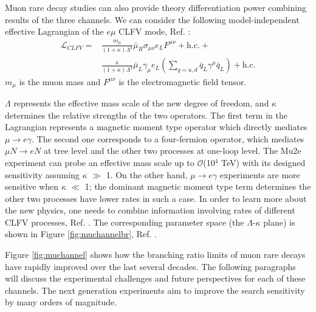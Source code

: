 Muon rare decay studies can also provide theory differentiation power 
combining results of the three channels. We can consider the following model-independent 
effective Lagrangian of the $e \mu$ CLFV mode, Ref. \cite{doi:10.1146/annurev-nucl-100809-131949}:
\begin{equation}\label{LCF}
\begin{aligned}
\mathscr{L}_{C L F V}= & \frac{m_\mu}{(1+\kappa) \Lambda^2} \bar{\mu}_R \sigma_{\mu \nu} e_L F^{\mu \nu}+\text{h.c.}+ \\
&\frac{\kappa}{(1+\kappa) \Lambda^2} \bar{\mu}_L \gamma_\mu e_L\left(\sum_{q=u, d} \bar{q}_L \gamma^\mu \bar{q}_L\right)+\text{h.c.}
\end{aligned}
\end{equation}
$m_\mu$ is the muon mass and  $F^{\mu \nu}$ is the electromagnetic field tensor.

$\Lambda$ represents the effective mass scale of the new degree of freedom, and $\kappa$
determines the relative strengths of the two operators. The first term in the Lagrangian represents a
magnetic moment type operator which directly mediates $\mu \rightarrow e \gamma$. 
The second one corresponds to a four-fermion operator, 
which mediates $\mu N \rightarrow eN$ at tree level and 
the other two processes at one-loop level.
The Mu2e experiment can probe an effective mass scale up 
to $\mathcal{O}$(10$^4$ TeV) with its designed sensitivity assuming $\kappa$ $\gg$ 1.
On the other hand, $\mu \rightarrow e\gamma$ experiments 
are more sensitive when $\kappa$ $\ll$ 1; the dominant magnetic
moment type term determines the other two processes have 
lower rates in such a case. In order to learn more about the new
physics, one needs to combine information involving rates 
of different CLFV processes, Ref. \cite{osti_1042577}.
The corresponding parameter space (the $\Lambda$-$\kappa$ plane) is shown in 
Figure \ref{fig:muchannelbr}, Ref. \cite{doi:10.1146/annurev-nucl-100809-131949}. 

Figure \ref{fig:muchannel} 
shows how the branching ratio limits of muon rare decays
have rapidly improved over the last several decades. The following paragraphs 
will discuss the experimental challenges and future perspectives 
for each of these channels. The next generation 
experiments aim to improve the search sensitivity by many orders of magnitude. 

